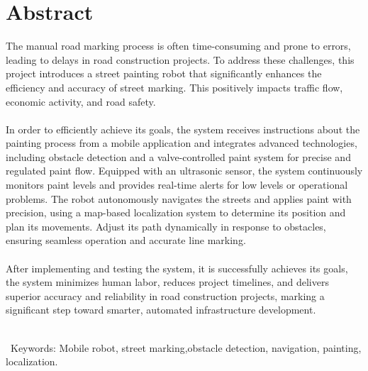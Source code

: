 \documentclass[oneside]{book}
\begin{document}
\chapter*{Abstract}
The manual road marking process is often time-consuming and prone to errors, leading to delays in road construction projects. To address these challenges, this project introduces a street painting robot that significantly enhances the efficiency and accuracy of street marking. This positively impacts traffic flow, economic activity, and road safety.\\\\

 In order to efficiently achieve its goals, the system receives instructions about the painting process from a mobile application and integrates advanced technologies, including obstacle detection and a valve-controlled paint system for precise and regulated paint flow. Equipped with an ultrasonic sensor, the system continuously monitors paint levels and provides real-time alerts for low levels or operational problems. The robot autonomously navigates the streets and applies paint with precision, using a map-based localization system to determine its position and plan its movements. Adjust its path dynamically in response to obstacles, ensuring seamless operation and accurate line marking.\\\\

After implementing and testing the system, it is successfully achieves its goals, the system minimizes human labor, reduces project timelines, and delivers superior accuracy and reliability in road construction projects, marking a significant step toward smarter, automated infrastructure development.\\\\


\vspace{3em} %

\noindent 
\
Keywords: Mobile robot, street marking,obstacle detection, navigation, painting, localization.
\newpage
\vspace{1em} %

\noindent 
\end{document}
